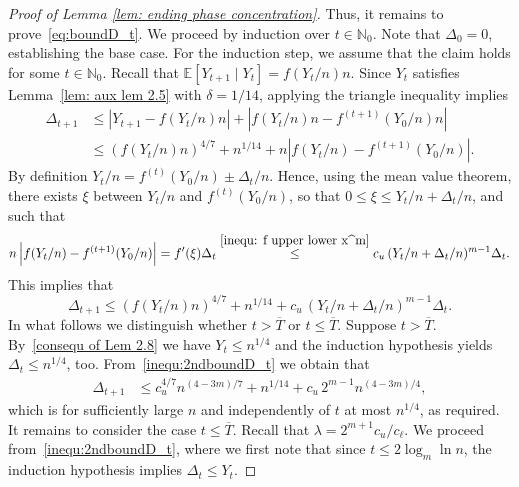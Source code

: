 \documentclass[10pt,a4paper]{amsart}
\begin{document}
\begin{proof}[Proof of Lemma \ref{lem: ending phase concentration}]
Thus, it remains to prove~\eqref{eq:boundD_t}. We proceed by induction over $t \in \mathbb{N}_0$. Note that $\Delta_{0}=0$, establishing the base case. For the induction step, we assume that the claim holds for some $t\in \mathbb{N}_0$.
Recall that $\mathbb{E}[Y_{t+1}\mid Y_t] = f(Y_t/n)n$. Since $Y_t$ satisfies Lemma~\ref{lem: aux lem 2.5} with $\delta = 1/14$, applying the triangle inequality implies
\begin{equation}\label{inequ: first bound delta}
\begin{aligned}
    \Delta_{t+1} &\leq \left|Y_{t+1}-f(Y_t/n)n \right| +\left|f(Y_t/n)n -  f^{(t+1)}(Y_0/n)n \right| \\
    &\leq (f(Y_t/n)n)^{4/7} + n^{1/14} + n\left|f(Y_t/n) -  f^{(t+1)}(Y_0/n) \right|.
\end{aligned}
\end{equation}
By definition $Y_t/n = f^{(t)}(Y_0/n) \pm \Delta_{t}/n$. Hence, using the mean value theorem, there exists $\xi$ between $Y_t/n$ and $f^{(t)}(Y_0/n)$, so that $0\leq \xi \leq Y_t/n + \Delta_t/n$, and such that
\begin{align*}
\label{inequ: second summand1}
    n \left|f(Y_t/n) -  f^{(t+1)}(Y_0/n) \right|
    = f'(\xi)\Delta_t
    \stackrel{\eqref{inequ: f upper lower x^m}}{\leq}c_u\, (Y_t/n +\Delta_t/n)^{m-1}  \Delta_t.
\end{align*}
This implies that 
\begin{equation}
\label{inequ:2ndboundD_t}
    \Delta_{t+1}
    \le
    (f(Y_t/n)n)^{4/7} + n^{1/14} + c_u\, (Y_t/n +\Delta_t/n)^{m-1}  \Delta_t.
\end{equation}
In what follows we distinguish whether $t > \overline{T}$ or $t \le \overline{T}$.
Suppose $t > \overline{T}$. 
By~\eqref{consequ of Lem 2.8} we have $Y_t\leq n^{1/4}$ and the induction hypothesis yields $\Delta_t\leq n^{1/4}$, too. 
From~\eqref{inequ:2ndboundD_t} we obtain that
    \begin{align*}
    \Delta_{t+1}
    &\leq c_u^{4/7}n^{(4-3m)/7}+n^{1/14}+c_u\,2^{m-1}n^{(4-3m)/4},
    \end{align*}
    which is for sufficiently large $n$ and independently of $t$ at most $n^{1/4}$, as required.
    It remains to consider the case $t\leq \overline{T}$.
Recall that $\lambda=2^{m+1}c_u/c_\ell$. We proceed from~\eqref{inequ:2ndboundD_t}, where we first note that since $t\leq2\log_m\ln n$, the induction hypothesis implies $\Delta_t\leq Y_t$.

\end{proof}
\end{document}
